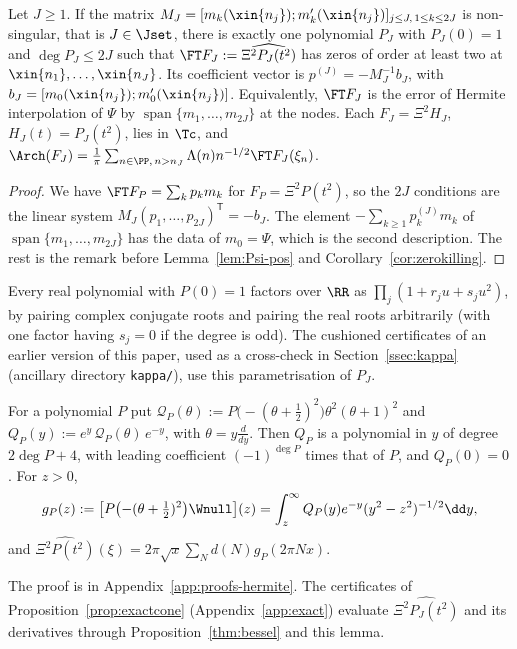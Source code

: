 \begin{proposition}\label{prop:E}
Let $J\ge1$. If the matrix $M_J=[m_k(\xin{n_j});m_k'(\xin{n_j})]_{j\le J,\,1\le k\le2J}$ is non-singular, that is $J\in\Jset$, there is exactly one
polynomial $P_J$ with $P_J(0)=1$ and $\deg P_J\le2J$ such that $\FT F_J:=\widehat{\Xi^2P_J(t^2)}$ has zeros of
order at least two at $\xin{n_1},\dots,\xin{n_J}$. Its coefficient vector is $p^{(J)}=-M_J^{-1}b_J$, with
$b_J=[m_0(\xin{n_j});m_0'(\xin{n_j})]$. Equivalently, $\FT F_J$ is the error of Hermite interpolation of
$\Psi$ by $\operatorname{span}\{m_1,\dots,m_{2J}\}$ at the nodes. Each $F_J=\Xi^2H_J$, $H_J(t)=P_J(t^2)$,
lies in $\Tc$, and $\Arch(F_J)=\frac1\pi\sum_{n\in\PP,\,n>n_J}\Lambda(n)n^{-1/2}\FT F_J(\xi_n)$.
\end{proposition}

\begin{proof}
We have $\FT F_P=\sum_kp_km_k$ for $F_P=\Xi^2P(t^2)$, so the $2J$ conditions are the
linear system $M_J(p_1,\dots,p_{2J})^{\mathsf T}=-b_J$. The element $-\sum_{k\ge1}p_k^{(J)}m_k$ of
$\operatorname{span}\{m_1,\dots,m_{2J}\}$ has the data of $m_0=\Psi$, which is the second description. The rest is
the remark before Lemma~\ref{lem:Psi-pos} and Corollary~\ref{cor:zerokilling}.
\end{proof}

Every real polynomial with $P(0)=1$ factors over $\RR$ as $\prod_j(1+r_ju+s_ju^2)$, by pairing complex
conjugate roots and pairing the real roots arbitrarily (with one factor having $s_j=0$ if the degree is odd). The cushioned certificates of an earlier version
of this paper, used as a cross-check in Section~\ref{ssec:kappa} (ancillary directory \nolinkurl{kappa/}), use this parametrisation of $P_J$.

\begin{lemma}\label{lem:abel}
For a polynomial $P$ put $\mathcal Q_P(\theta):=P\bigl(-(\theta+\tfrac12)^2\bigr)\theta^2(\theta+1)^2$ and
$Q_P(y):=e^{y}\,\mathcal Q_P(\theta)\,e^{-y}$, with $\theta=y\frac{d}{dy}$. Then $Q_P$ is a polynomial in $y$ of degree $2\deg P+4$, with
leading coefficient $(-1)^{\deg P}$ times that of $P$, and $Q_P(0)=0$. For $z>0$,
\[
g_P(z):=\bigl[P\bigl(-(\theta+\tfrac12)^2\bigr)\Wnull\bigr](z)=\int_z^\infty Q_P(y)e^{-y}(y^2-z^2)^{-1/2}\dd y,
\]
and $\widehat{\Xi^2P(t^2)}(\xi)=2\pi\sqrt x\sum_Nd(N)g_P(2\pi Nx)$.
\end{lemma}

The proof is in Appendix~\ref{app:proofs-hermite}. The certificates of Proposition~\ref{prop:exactcone} (Appendix~\ref{app:exact}) evaluate $\widehat{\Xi^2P_J(t^2)}$ and its derivatives through Proposition~\ref{thm:bessel} and this lemma.

